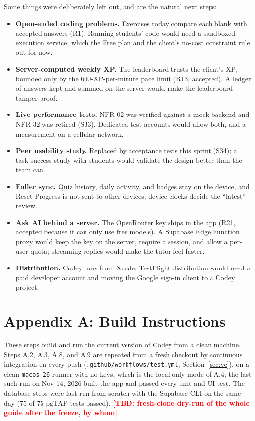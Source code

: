 \documentclass[12pt,letterpaper]{article}
\newcommand{\tbd}[1]{\textcolor{red}{\textbf{[TBD: #1]}}}
\begin{document}
Some things were deliberately left out, and are the natural next steps:
\begin{itemize}
  \item \textbf{Open-ended coding problems.} Exercises today compare each blank with
        accepted answers (R1). Running students' code would need a sandboxed
        execution service, which the Free plan and the client's no-cost constraint
        rule out for now.
  \item \textbf{Server-computed weekly XP.} The leaderboard trusts the client's XP,
        bounded only by the 600-XP-per-minute pace limit (R13, accepted). A ledger of
        answers kept and summed on the server would make the leaderboard
        tamper-proof.
  \item \textbf{Live performance tests.} NFR-02 was verified against a mock backend
        and NFR-32 was retired (S33). Dedicated test accounts would allow both, and
        a measurement on a cellular network.
  \item \textbf{Peer usability study.} Replaced by acceptance tests this sprint (S34);
        a task-success study with students would validate the design better than the
        team can.
  \item \textbf{Fuller sync.} Quiz history, daily activity, and badges stay on the
        device, and Reset Progress is not sent to other devices; device clocks decide
        the ``latest'' review.
  \item \textbf{Ask AI behind a server.} The OpenRouter key ships in the app (R21,
        accepted because it can only use free models). A Supabase Edge Function proxy
        would keep the key on the server, require a session, and allow a per-user
        quota; streaming replies would make the tutor feel faster.
  \item \textbf{Distribution.} Codey runs from Xcode. TestFlight distribution would
        need a paid developer account and moving the Google sign-in client to a Codey
        project.
\end{itemize}

\section*{Appendix A: Build Instructions}\label{sec:appA}
These steps build and run the current version of Codey from a clean machine. Steps
A.2, A.3, A.8, and A.9 are repeated from a fresh checkout by continuous integration on
every push (\texttt{.github/workflows/test.yml}, Section~\ref{sec:vc}), on a clean
\texttt{macos-26} runner with no keys, which is the local-only mode of A.4; the last
such run on Nov 14, 2026 built the app and passed every unit and UI test. The database
steps were last run from scratch with the Supabase CLI on the same day (75 of 75 pgTAP
tests passed). \tbd{fresh-clone dry-run of the whole guide after the freeze, by whom}.
\end{document}
